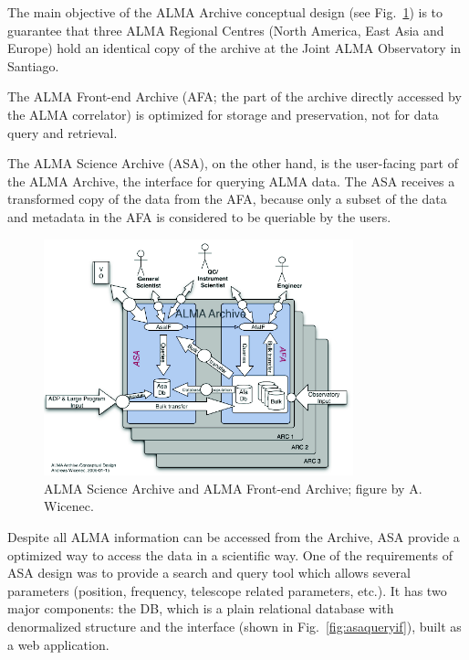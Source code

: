 The main objective of the
ALMA Archive
conceptual design (see Fig.~\ref{fig:asa_afa})
is to guarantee that three ALMA Regional Centres (North America,
East Asia %
and Europe) hold an identical copy of the archive at the Joint ALMA Observatory in Santiago. 

The ALMA Front-end Archive (AFA; the part of the archive directly accessed by the ALMA correlator)
is optimized for storage and preservation, not for data query and retrieval.

The ALMA Science Archive (ASA), on the other hand, is the user-facing part of the ALMA Archive, the interface for querying ALMA data. The ASA receives a transformed copy of the data from the AFA, because only a subset of the data and metadata in the AFA is considered to be queriable by the users.

\begin{figure}
\centering
\includegraphics[width=0.8\textwidth]{images/alma_science_archive.png}
\caption{ALMA Science Archive and ALMA Front-end Archive; figure by A. Wicenec.}
\label{fig:asa_afa}
\end{figure}





Despite all ALMA information can be accessed from the Archive, ASA provide a optimized way to access the data in a scientific way. One of the requirements of ASA design was to provide a search and query tool which allows several parameters (position, frequency, telescope related parameters, etc.). It has two major components: the DB, which is a plain relational database with denormalized structure and the interface
(shown in Fig.~\ref{fig:asaqueryif}),
built as a web application.

